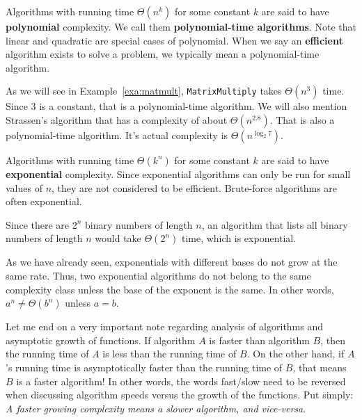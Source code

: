 \begin{df}[Polynomial]
Algorithms with running time $\Theta(n^k)$ for some constant $k$ are 
said to have {\bf polynomial} complexity.  We call them 
{\bf polynomial-time algorithms}.  
Note that linear and quadratic are special cases of polynomial.
When we say an {\bf efficient} 
algorithm exists to solve a problem,
we typically mean a polynomial-time algorithm.
\end{df}

\begin{exa}
As we will see in Example~\ref{exa:matmult}, \verb+MatrixMultiply+ takes $\Theta(n^3)$ time.
Since $3$ is a constant, that is a polynomial-time algorithm.
We will also mention Strassen's algorithm that has a complexity of about $\Theta(n^{2.8})$.
That is also a polynomial-time algorithm.  It's actual complexity is 
$\Theta(n^{\log_2 7})$.
\end{exa}


\begin{df}[Exponential]
Algorithms with running time $\Theta(k^n)$ for some constant $k$ are 
said to have {\bf exponential} complexity. 
Since exponential algorithms can only be run for small values of $n$, 
they are not considered to be efficient.
Brute-force algorithms are often exponential.
\end{df}

\begin{exa}
Since there are $2^n$ binary numbers of length $n$, 
an algorithm that lists all binary numbers of length $n$ would take $\Theta(2^n)$ time,
which is exponential.
\end{exa}

\begin{rem}
As we have already seen, 
exponentials with different bases do not grow at the same rate.
Thus, two exponential algorithms do not belong to the same complexity class 
unless the base of the exponent is the same.
In other words, $a^n\neq\Theta(b^n)$ unless $a=b$.
\end{rem}

Let me end on a very important note regarding analysis of algorithms and asymptotic growth of functions.
If algorithm $A$ is faster than algorithm $B$, 
then the running time of $A$ is less than the running time of $B$.
On the other hand, if $A$'s running time is asymptotically faster than the running time of $B$,
that means $B$ is a faster algorithm!  
In other words, the words fast/slow need to be reversed when discussing
algorithm speeds versus the growth of the functions.
Put simply: {\em A faster growing complexity means a slower algorithm, and vice-versa}.

